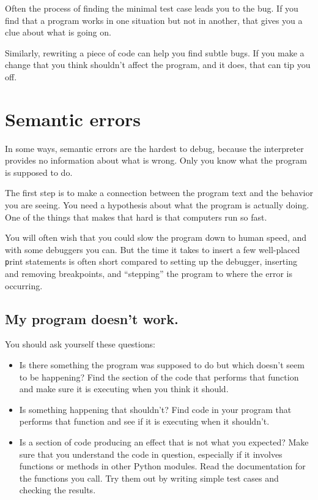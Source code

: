 \documentclass[
DIV=11,
fontsize=12,
twoside,
headinclude=false,
titlepage=firstiscover,
abstract=true,
headsepline=true,
footsepline=true,
chapterprefix=true, %
headings=big,
bibliography=totoc,%
captions=tableheading
]{scrbook}
\theoremstyle{definition}
\begin{document}
Often the process of finding the minimal test case leads you to the
bug.  If you find that a program works in one situation but not in
another, that gives you a clue about what is going on.

Similarly, rewriting a piece of code can help you find subtle
bugs.  If you make a change that you think shouldn't affect the
program, and it does, that can tip you off.


\section{Semantic errors}

In some ways, semantic errors are the hardest to debug,
because the interpreter provides no information
about what is wrong.  Only you know what the program is supposed to
do.

The first step is to make a connection between the program
text and the behavior you are seeing.  You need a hypothesis
about what the program is actually doing.  One of the things
that makes that hard is that computers run so fast.

You will often wish that you could slow the program down to human
speed, and with some debuggers you can.  But the time it takes to
insert a few well-placed {\texttt print} statements is often short compared to
setting up the debugger, inserting and removing breakpoints, and
``stepping'' the program to where the error is occurring.


\subsection{My program doesn't work.}

You should ask yourself these questions:

\begin{itemize}

\item Is there something the program was supposed to do but
which doesn't seem to be happening?  Find the section of the code
that performs that function and make sure it is executing when
you think it should.

\item Is something happening that shouldn't?  Find code in
your program that performs that function and see if it is
executing when it shouldn't.

\item Is a section of code producing an effect that is not
what you expected?  Make sure that you understand the code in
question, especially if it involves functions or methods in
other Python modules.  Read the documentation for the functions you call.
Try them out by writing simple test cases and checking the results.

\end{itemize}
\end{document}
